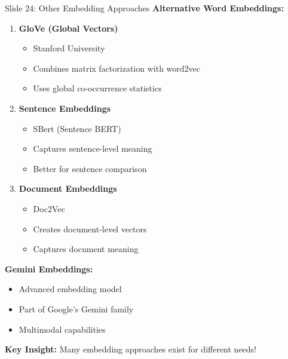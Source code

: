 \documentclass[8pt]{beamer}
\begin{document}
	\begin{frame}{Slide 24: Other Embedding Approaches}
		\fontsize{6.5}{7.5}\selectfont
		\textbf{Alternative Word Embeddings:}
		\begin{enumerate}
			\item \textbf{GloVe (Global Vectors)}
			\begin{itemize}
				\item Stanford University
				\item Combines matrix factorization with word2vec
				\item Uses global co-occurrence statistics
			\end{itemize}
			\item \textbf{Sentence Embeddings}
			\begin{itemize}
				\item SBert (Sentence BERT)
				\item Captures sentence-level meaning
				\item Better for sentence comparison
			\end{itemize}
			\item \textbf{Document Embeddings}
			\begin{itemize}
				\item Doc2Vec
				\item Creates document-level vectors
				\item Captures document meaning
			\end{itemize}
		\end{enumerate}
		
		\vspace{0.1cm}
		\textbf{Gemini Embeddings:}
		\begin{itemize}
			\item Advanced embedding model
			\item Part of Google's Gemini family
			\item Multimodal capabilities
		\end{itemize}
		
		\textcolor{myblue}{\textbf{Key Insight:}} Many embedding approaches exist for different needs!
	\end{frame}
	
\end{document}

